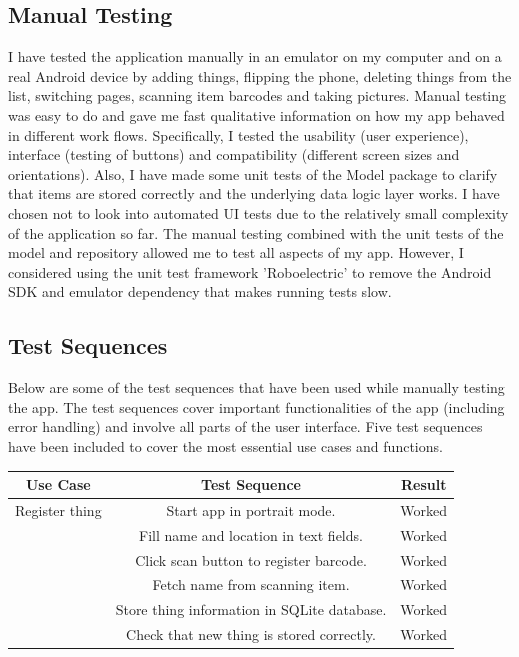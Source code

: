 \documentclass{article} %
\begin{document}
\subsection{Manual Testing}
I have tested the application manually in an emulator on my computer and on a real Android device by adding things, flipping the phone, deleting things from the list, switching pages, scanning item barcodes and taking pictures. Manual testing was easy to do and gave me fast qualitative information on how my app behaved in different work flows. Specifically, I tested the usability (user experience), interface (testing of buttons) and compatibility (different screen sizes and orientations). Also, I have made some unit tests of the Model package to clarify that items are stored correctly and the underlying data logic layer works. I have chosen not to look into automated UI tests due to the relatively small complexity of the application so far. The manual testing combined with the unit tests of the model and repository allowed me to test all aspects of my app. However, I considered using the unit test framework 'Roboelectric' to remove the Android SDK and emulator dependency that makes running tests slow. 

\subsection{Test Sequences}

Below are some of the test sequences that have been used while manually testing the app. The test sequences cover important functionalities of the app (including error handling) and involve all parts of the user interface. Five test sequences have been included to cover the most essential use cases and functions. 



\begin{center}
 \begin{tabular}{||c c c||} 
 \hline
 Use Case & Test Sequence & Result \\ [0.5ex] 
 \hline\hline
 Register thing & Start app in portrait mode. & Worked \\ 
 \hline
 & Fill name and location in text fields. & Worked \\
 \hline
 & Click scan button to register barcode. & Worked \\
 \hline
 & Fetch name from scanning item. & Worked \\
 \hline
 & Store thing information in SQLite database. & Worked \\
 \hline
 & Check that new thing is stored correctly. & Worked \\ [1ex] 
   \hline
\end{tabular}
\end{center}
\end{document}
